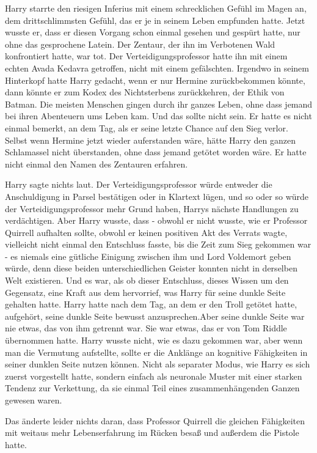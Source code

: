 Harry starrte den riesigen Inferius mit einem schrecklichen Gefühl im Magen an,
dem drittschlimmsten Gefühl, das er je in seinem Leben empfunden hatte. Jetzt
wusste er, dass er diesen Vorgang schon einmal gesehen und gespürt hatte, nur
ohne das gesprochene Latein. Der Zentaur, der ihn im Verbotenen Wald
konfrontiert hatte, war tot. Der Verteidigungsprofessor hatte ihn mit einem
echten Avada Kedavra getroffen, nicht mit einem gefälschten. Irgendwo in seinem
Hinterkopf hatte Harry gedacht, wenn er nur Hermine zurückbekommen könnte, dann
könnte er zum Kodex des Nichtsterbens zurückkehren, der Ethik von Batman. Die
meisten Menschen gingen durch ihr ganzes Leben, ohne dass jemand bei ihren
Abenteuern ums Leben kam. Und das sollte nicht sein. Er hatte es nicht einmal
bemerkt, an dem Tag, als er seine letzte Chance auf den Sieg verlor. Selbst wenn
Hermine jetzt wieder auferstanden wäre, hätte Harry den ganzen Schlamassel nicht
überstanden, ohne dass jemand getötet worden wäre. Er hatte nicht einmal den
Namen des Zentauren erfahren.

Harry sagte nichts laut. Der Verteidigungsprofessor würde entweder die
Anschuldigung in Parsel bestätigen oder in Klartext lügen, und so oder so würde
der Verteidigungsprofessor mehr Grund haben, Harrys nächste Handlungen zu
verdächtigen. Aber Harry wusste, dass - obwohl er nicht wusste, wie er Professor
Quirrell aufhalten sollte, obwohl er keinen positiven Akt des Verrats wagte,
vielleicht nicht einmal den Entschluss fasste, bis die Zeit zum Sieg gekommen
war - es niemals eine gütliche Einigung zwischen ihm und Lord Voldemort geben
würde, denn diese beiden unterschiedlichen Geister konnten nicht in derselben
Welt existieren. Und es war, als ob dieser Entschluss, dieses Wissen um den
Gegensatz, eine Kraft aus dem hervorrief, was Harry für seine dunkle Seite
gehalten hatte. Harry hatte nach dem Tag, an dem er den Troll getötet hatte,
aufgehört, seine dunkle Seite bewusst anzusprechen.Aber seine dunkle Seite war
nie etwas, das von ihm getrennt war. Sie war etwas, das er von Tom Riddle
übernommen hatte. Harry wusste nicht, wie es dazu gekommen war, aber wenn man
die Vermutung aufstellte, sollte er die Anklänge an kognitive Fähigkeiten in
seiner dunklen Seite nutzen können. Nicht als separater Modus, wie Harry es sich
zuerst vorgestellt hatte, sondern einfach als neuronale Muster mit einer starken
Tendenz zur Verkettung, da sie einmal Teil eines zusammenhängenden Ganzen
gewesen waren.

Das änderte leider nichts daran, dass Professor Quirrell die gleichen
Fähigkeiten mit weitaus mehr Lebenserfahrung im Rücken besaß und außerdem die
Pistole hatte.

